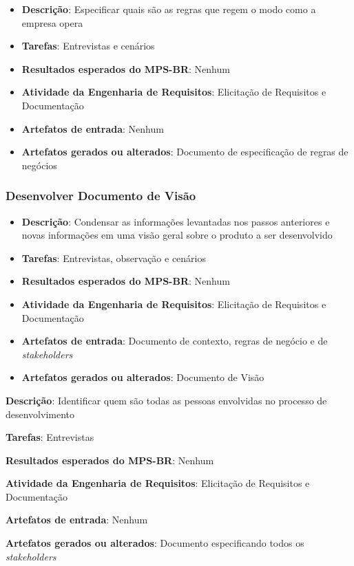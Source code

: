 \begin{itemize}
\item \textbf{Descrição}: Especificar quais são as regras que regem o modo como a empresa opera
\item \textbf{Tarefas}: Entrevistas e cenários
\item \textbf{Resultados esperados do MPS-BR}: Nenhum
\item \textbf{Atividade da Engenharia de Requisitos}: Elicitação de Requisitos e Documentação
\item \textbf{Artefatos de entrada}: Nenhum
\item \textbf{Artefatos gerados ou alterados}: Documento de especificação de regras de negócios
\end{itemize}

\subsubsection{Desenvolver Documento de Visão}

\begin{itemize}
\item \textbf{Descrição}: Condensar as informações levantadas nos passos anteriores e novas informações em uma visão geral sobre o produto a ser desenvolvido
\item \textbf{Tarefas}: Entrevistas, observação e cenários
\item \textbf{Resultados esperados do MPS-BR}: Nenhum
\item \textbf{Atividade da Engenharia de Requisitos}: Elicitação de Requisitos e Documentação
\item \textbf{Artefatos de entrada}: Documento de contexto, regras de negócio e de \textit{stakeholders}
\item \textbf{Artefatos gerados ou alterados}: Documento de Visão
\end{itemize}

\begin{description}
\item\textbf{Descrição}: Identificar quem são todas as pessoas envolvidas no processo de desenvolvimento
\item\textbf{Tarefas}: Entrevistas
\item\textbf{Resultados esperados do MPS-BR}: Nenhum
\item\textbf{Atividade da Engenharia de Requisitos}: Elicitação de Requisitos e Documentação
\item\textbf{Artefatos de entrada}: Nenhum
\item\textbf{Artefatos gerados ou alterados}: Documento especificando todos os \textit{stakeholders}
\end{description}


